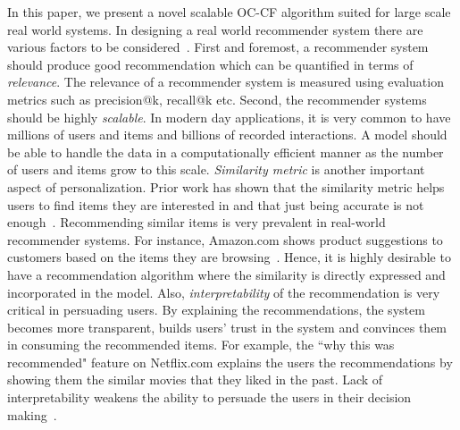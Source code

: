 In this paper, we present a novel scalable OC-CF algorithm suited for large scale real world systems. 
In designing a real world recommender system there are various factors to be 
considered~\citep{adomavicius2005toward, ricci2011introduction}. First and foremost, a recommender system should  produce good recommendation which can be quantified in terms of \textsl{relevance}. The relevance of a recommender system is measured using evaluation metrics such as \textsf{precision@k}, \textsf{recall@k} etc. Second, the recommender systems should be highly \textsl{scalable}. In modern day applications, it is very common to have millions of users and items and billions of recorded interactions. A model should be able to handle the data in a computationally efficient manner as the number of users and items grow to this scale. \textsl{Similarity metric} is another important aspect of personalization. Prior work has shown that the similarity metric helps users to find items they are interested in and that just being accurate is not enough~\citep{mcnee2006being}.  Recommending similar items is very prevalent in  real-world recommender systems. For instance, Amazon.com shows product suggestions to customers based on the items they are browsing~\citep{linden2003amazon}. Hence, it is highly desirable to have a recommendation algorithm where the similarity is directly expressed and incorporated in the model. Also, \textsl{interpretability} of the recommendation is very critical in persuading users. By explaining the recommendations, the system becomes more transparent, builds users' trust in the system and convinces them in consuming the recommended items. For example, the ``why this was recommended" feature on Netflix.com explains the users the recommendations by showing them the similar movies that they liked in the past. Lack of interpretability weakens the ability to persuade the users in their decision making~\citep{explainabiltyVIG2009}.

